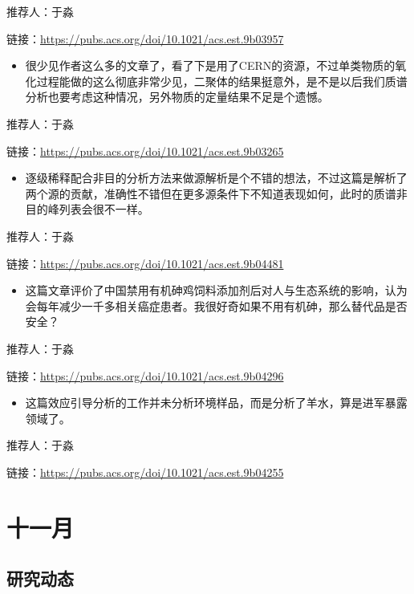 \documentclass[]{book}
\providecommand{\tightlist}{%
  \setlength{\itemsep}{0pt}\setlength{\parskip}{0pt}}
\begin{document}
推荐人：于淼

链接：\url{https://pubs.acs.org/doi/10.1021/acs.est.9b03957}

\begin{itemize}
\tightlist
\item
  很少见作者这么多的文章了，看了下是用了CERN的资源，不过单类物质的氧化过程能做的这么彻底非常少见，二聚体的结果挺意外，是不是以后我们质谱分析也要考虑这种情况，另外物质的定量结果不足是个遗憾。
\end{itemize}

推荐人：于淼

链接：\url{https://pubs.acs.org/doi/10.1021/acs.est.9b03265}

\begin{itemize}
\tightlist
\item
  逐级稀释配合非目的分析方法来做源解析是个不错的想法，不过这篇是解析了两个源的贡献，准确性不错但在更多源条件下不知道表现如何，此时的质谱非目的峰列表会很不一样。
\end{itemize}

推荐人：于淼

链接：\url{https://pubs.acs.org/doi/10.1021/acs.est.9b04481}

\begin{itemize}
\tightlist
\item
  这篇文章评价了中国禁用有机砷鸡饲料添加剂后对人与生态系统的影响，认为会每年减少一千多相关癌症患者。我很好奇如果不用有机砷，那么替代品是否安全？
\end{itemize}

推荐人：于淼

链接：\url{https://pubs.acs.org/doi/10.1021/acs.est.9b04296}

\begin{itemize}
\tightlist
\item
  这篇效应引导分析的工作并未分析环境样品，而是分析了羊水，算是进军暴露领域了。
\end{itemize}

推荐人：于淼

链接：\url{https://pubs.acs.org/doi/10.1021/acs.est.9b04255}

\hypertarget{ux5341ux4e00ux6708-2}{%
\section*{十一月}\label{ux5341ux4e00ux6708-2}}

\hypertarget{ux7814ux7a76ux52a8ux6001-24}{%
\subsection*{研究动态}\label{ux7814ux7a76ux52a8ux6001-24}}
\end{document}
